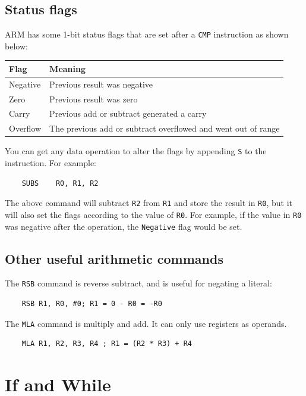 \documentclass{article}
\begin{document}
\subsection{Status flags}

ARM has some 1-bit status flags that are set after a {\tt CMP} instruction as shown below:

\begin{tabular}{l|l}
	Flag & Meaning\\ \hline
	Negative & Previous result was negative\\ \hline
	Zero & Previous result was zero\\ \hline
	Carry & Previous add or subtract generated a carry\\ \hline
	Overflow & The previous add or subtract overflowed and went out of range\\ \hline
\end{tabular}

You can get any data operation to alter the flags by appending {\tt S} to the instruction. For example:

\begin{verbatim}
	SUBS	R0, R1, R2
\end{verbatim}

The above command will subtract {\tt R2} from {\tt R1} and store the result in {\tt R0}, but it will also set the flags according to the value of {\tt R0}. For example, if the value in {\tt R0} was negative after the operation, the {\tt Negative} flag would be set.

\subsection{Other useful arithmetic commands}

The {\tt RSB} command is reverse subtract, and is useful for negating a literal:

\begin{verbatim}
	RSB	R1, R0, #0; R1 = 0 - R0 = -R0
\end{verbatim}

The {\tt MLA} command is multiply and add. It can only use registers as operands.

\begin{verbatim}
	MLA	R1, R2, R3, R4 ; R1 = (R2 * R3) + R4
\end{verbatim}

\section{If and While}
\end{document}
